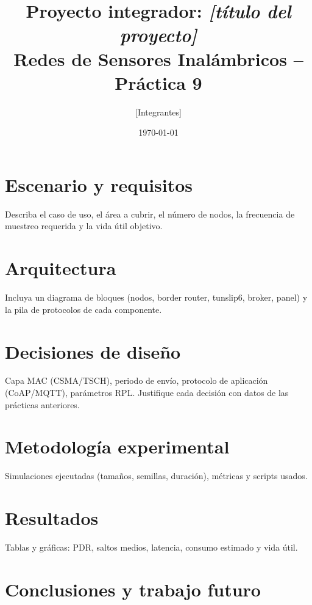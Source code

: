 \documentclass[11pt,a4paper]{article}
\title{Proyecto integrador: \emph{[título del proyecto]}\\
\large Redes de Sensores Inalámbricos -- Práctica 9}
\author{[Integrantes]}
\date{\today}
\begin{document}
\maketitle
\section{Escenario y requisitos}
Describa el caso de uso, el área a cubrir, el número de nodos, la frecuencia de muestreo requerida y la vida útil objetivo.
\section{Arquitectura}
Incluya un diagrama de bloques (nodos, border router, tunslip6, broker, panel) y la pila de protocolos de cada componente.
\section{Decisiones de diseño}
Capa MAC (CSMA/TSCH), periodo de envío, protocolo de aplicación (CoAP/MQTT), parámetros RPL. Justifique cada decisión con datos de las prácticas anteriores.
\section{Metodología experimental}
Simulaciones ejecutadas (tamaños, semillas, duración), métricas y scripts usados.
\section{Resultados}
Tablas y gráficas: PDR, saltos medios, latencia, consumo estimado y vida útil.
\section{Conclusiones y trabajo futuro}
\end{document}
